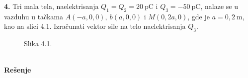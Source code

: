 \textbf{\Large 4.} Tri mala tela, naelektrisanja $Q_1=Q_2 = 20\ \mathrm{pC}$ i $Q_3 = -50\ \mathrm{pC}$, nalaze se u vazduhu u ta\v{c}kama $A(-a, 0, 0),\ b(a, 0, 0)$ i $M(0,2a, 0)$, gde je  $a = 0,2\ \mathrm m$, kao na slici 4.1. Izra\v{c}unati vektor sile na telo naelektrisanja $Q_3$.
\begin{figure}[h]
    \centering
    
    \caption{Slika 4.1.}
\end{figure}
\\
\textbf{\Large Re\v{s}enje}\\
